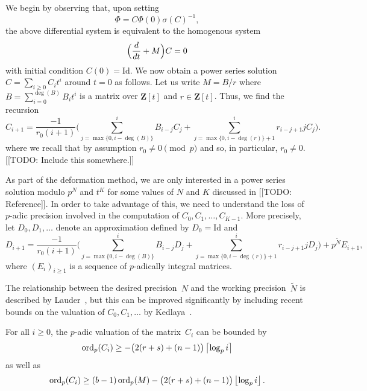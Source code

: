 We begin by observing that, upon setting 
\begin{equation}
\Phi = C \Phi(0) \sigma(C)^{-1},
\end{equation}
the above differential system is equivalent to the homogenous system 
\begin{equation} \label{eq:de}
\Bigl(\frac{d}{dt} + M\Bigr) C = 0
\end{equation}
with initial condition $C(0) = \text{Id}$.  We now obtain a power series 
solution $C = \sum_{i \geq 0} C_i t^i$ around $t=0$ as follows.  Let us 
write $M = B/r$ where $B = \sum_{i=0}^{\deg(B)} B_i t^i$ is a matrix over 
$\mathbf{Z}[t]$ and $r \in \mathbf{Z}[t]$.  Thus, we find the recursion 
\begin{equation}
C_{i+1} = \frac{-1}{r_0 (i+1)} \biggl(
    \sum_{j=\max{\{0,i-\deg(B)\}}}^i B_{i-j} C_j + 
    \sum_{j=\max{\{0,i-\deg(r)\}}+1}^i r_{i-j+1} j C_j \biggr).
\end{equation}
where we recall that by assumption $r_0 \neq 0 \pmod{p}$ and so, 
in particular, $r_0 \neq 0$.  [[TODO:  Include this somewhere.]]

As part of the deformation method, we are only interested in a power 
series solution modulo $p^N$ and $t^K$ for some values of $N$ and $K$ 
discussed in [[TODO: Reference]].  In order to take advantage of this, 
we need to understand the loss of $p$-adic precision involved in the 
computation of $C_0, C_1, \dotsc, C_{K-1}$.  More precisely, let 
$D_0, D_1, \dotsc$ denote an approximation defined by $D_0 = \text{Id}$ 
and 
\begin{equation}
D_{i+1} = \frac{-1}{r_0 (i+1)} \biggl(
    \sum_{j=\max{\{0,i-\deg(B)\}}}^i B_{i-j} D_j + 
    \sum_{j=\max{\{0,i-\deg(r)\}}+1}^i r_{i-j+1} j D_j \biggr) + 
    p^{\tilde{N}} E_{i+1},
\end{equation}
where $(E_i)_{i \geq 1}$ is a sequence of $p$-adically integral matrices. 

The relationship between the desired precision~$N$ and the working 
precision~$\tilde{N}$ is described by Lauder~\citep[Theorem~5.1]{Lauder2006}, 
but this can be improved significantly by including recent bounds on the 
valuation of $C_0, C_1, \dotsc$ by Kedlaya~\citep{Kedlaya2010}.

\begin{thm} \label{thm:valC}
For all $i \geq 0$, the $p$-adic valuation of the matrix~$C_i$ 
can be bounded by 
\begin{equation}
\operatorname{ord}_p(C_i) \geq - \bigl(2 (r + s) + (n - 1)\bigr) \left\lceil\log_p i\right\rceil
\end{equation}
as well as 
\begin{equation}
\operatorname{ord}_p(C_i) \geq (b - 1) \operatorname{ord}_p(M) - \bigl(2 (r + s) + (n - 1)\bigr) \left\lfloor\log_p i\right\rfloor.
\end{equation}
\end{thm}

